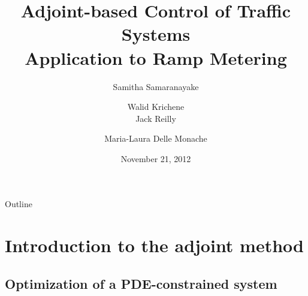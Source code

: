 \documentclass[xcolor=svgnames, english, smaller]{beamer}
\theoremstyle{plain}
\theoremstyle{definition}
\theoremstyle{plain}
\theoremstyle{plain}
\begin{document}
\title{Adjoint-based Control of Traffic Systems\\
Application to Ramp Metering }
\author{Samitha Samaranayake \and Walid Krichene \\ Jack Reilly \and Maria-Laura Delle Monache}
\institute{}
\date{November 21, 2012}


\begin{frame}
\titlepage
\end{frame}

\begin{frame}{Outline}
\tableofcontents
\end{frame}


\section{Introduction to the adjoint method}
\subsection{Optimization of a PDE-constrained system}
\end{document}
